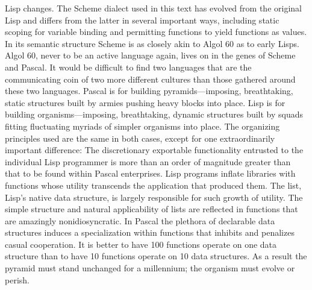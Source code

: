 \documentclass[oneside]{book}
\begin{document}
Lisp changes.  The Scheme dialect used in this text has evolved from the
original Lisp and differs from the latter in several important ways, including
static scoping for variable binding and permitting functions to yield functions
as values.  In its semantic structure Scheme is as closely akin to Algol 60 as
to early Lisps.  Algol 60, never to be an active language again, lives on in
the genes of Scheme and Pascal.  It would be difficult to find two languages
that are the communicating coin of two more different cultures than those
gathered around these two languages.  Pascal is for building
pyramids---imposing, breathtaking, static structures built by armies pushing
heavy blocks into place.  Lisp is for building organisms---imposing,
breathtaking, dynamic structures built by squads fitting fluctuating myriads of
simpler organisms into place.  The organizing principles used are the same in
both cases, except for one extraordinarily important difference: The
discretionary exportable functionality entrusted to the individual Lisp
programmer is more than an order of magnitude greater than that to be found
within Pascal enterprises.  Lisp programs inflate libraries with functions
whose utility transcends the application that produced them.  The list, Lisp's
native data structure, is largely responsible for such growth of utility.  The
simple structure and natural applicability of lists are reflected in functions
that are amazingly nonidiosyncratic.  In Pascal the plethora of declarable data
structures induces a specialization within functions that inhibits and
penalizes casual cooperation.  It is better to have 100 functions operate on
one data structure than to have 10 functions operate on 10 data structures.  As
a result the pyramid must stand unchanged for a millennium; the organism must
evolve or perish.
\end{document}
